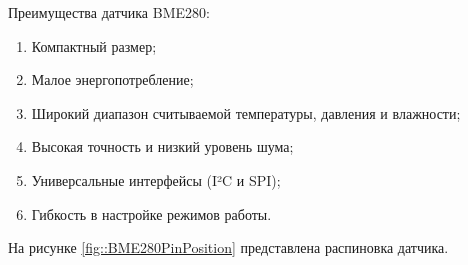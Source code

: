 Преимущества датчика BME280:

\begin{enumerate}

    \item Компактный размер;
	
    \item Малое энергопотребление;
	
    \item Широкий диапазон считываемой температуры, давления и влажности;
    
    \item Высокая точность и низкий уровень шума;
 
    \item Универсальные интерфейсы (I²C и SPI);
    
    \item Гибкость в настройке режимов работы.
    
\end{enumerate}

На рисунке \ref{fig::BME280PinPosition} представлена распиновка датчика.


